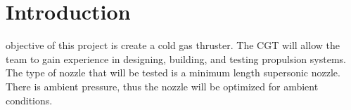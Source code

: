 \documentclass[conference]{IEEEtran} %
\begin{document}
\label{sec:nomenclature}
\newcommand{\nomunit}[1]{%
\renewcommand{\nomentryend}{\hspace*{\fill}#1}}
\renewcommand{\nompreamble}{

  }
\printnomenclature{}



\section{Introduction}
\label{sec:introduction}

 objective of this project is create a cold gas thruster. The CGT will allow the team to gain experience in designing, building,
and testing propulsion systems. The type of nozzle that will be tested is a minimum length supersonic nozzle. There is ambient pressure, thus the
nozzle will be optimized for ambient conditions.
\end{document}
